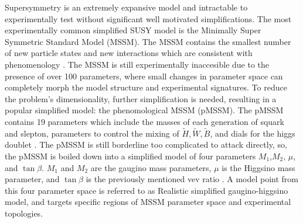 Supersymmetry is an extremely expansive model and intractable to experimentally test without significant well motivated simplifications. The most experimentally common simplified SUSY model is the Minimally Super Symmetric Standard Model (MSSM). The MSSM contains the smallest number of new particle states and new interactions which are consistent with phenomenology \cite{Baer:2007izw}. The MSSM is still experimentally inaccesible due to the presence of over 100 parameters, where small changes in parameter space can completely morph the model structure and experimental signatures. To reduce the problem's dimensionality, further simplification is needed, resulting in a popular simplified model: the phenomological MSSM (pMSSM). The pMSSM contains 19 parameters which include the masses of each generation of squark and slepton, parameters to control the mixing of $\tilde{H}, \tilde{W}, \tilde{B}$, and dials for the higgs doublet \cite{MSSMWorkingGroup:1998fiq}.  The pMSSM is still borderline too complicated to attack directly, so, the pMSSM is boiled down into a simplified model of four parameters $M_1$,$M_2$, $\mu$, and $\tan\beta$. $M_1$ and $M_2$ are the gaugino mass parameters, $\mu$ is the Higgsino mass parameter, and $\tan\beta$ is the previously mentioned vev ratio \cite{Fuks_2018}.  A model point from this four parameter space is referred to as Realistic simplified gaugino-higgsino model, and targets specific regions of MSSM parameter space and experimental topologies.

